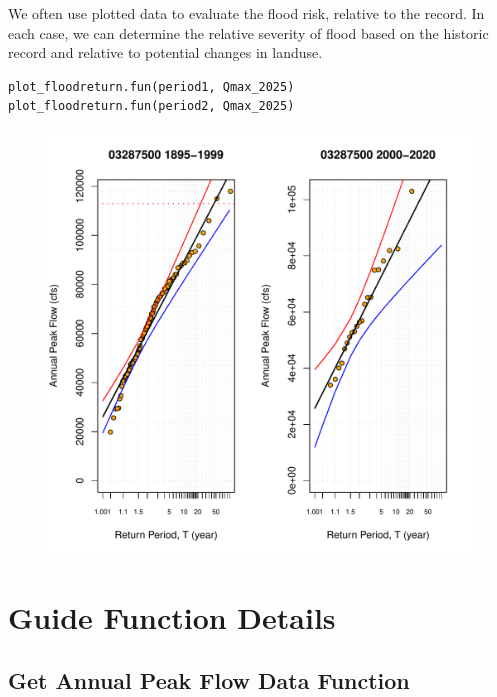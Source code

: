 \documentclass{tufte-handout}\usepackage[]{graphicx}\usepackage[]{xcolor}
\makeatletter
\def\maxwidth{ %
  \ifdim\Gin@nat@width>\linewidth
    \linewidth
  \else
    \Gin@nat@width
  \fi
}
\newenvironment{knitrout}{}{} %
\makeatother
\begin{document}
We often use plotted data to evaluate the flood risk, relative to the record. In 
each case, we can determine the relative severity of flood based on the historic
record and relative to potential changes in landuse.

\begin{verbatim}
plot_floodreturn.fun(period1, Qmax_2025)
plot_floodreturn.fun(period2, Qmax_2025)
\end{verbatim}

\begin{figure}[h]
\begin{knitrout}
\color{fgcolor}
\includegraphics[width=\maxwidth]{figure/unnamed-chunk-19-1} 
\end{knitrout}
\end{figure}

\clearpage

\section{Guide Function Details}

\subsection{Get Annual Peak Flow Data Function}
\end{document}
